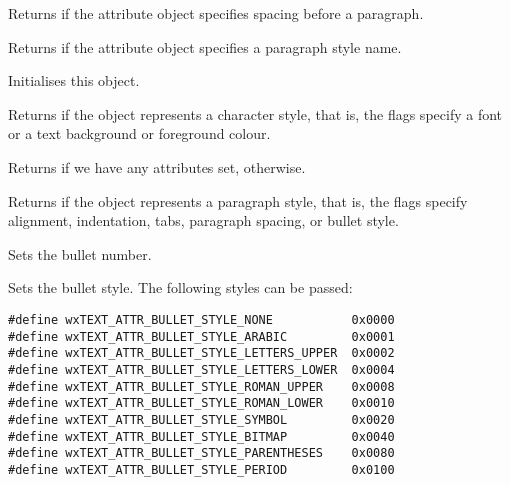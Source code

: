 
Returns \true if the attribute object specifies spacing before a paragraph.

\label{wxtextattrexhasparagraphstylename}


Returns \true if the attribute object specifies a paragraph style name.

\label{wxtextattrexinit}


Initialises this object.

\label{wxtextattrexischaracterstyle}


Returns \true if the object represents a character style, that is,
the flags specify a font or a text background or foreground colour.

\label{wxtextattrexisdefault}


Returns \false if we have any attributes set, \true otherwise.

\label{wxtextattrexisparagraphstyle}


Returns \true if the object represents a paragraph style, that is,
the flags specify alignment, indentation, tabs, paragraph spacing, or
bullet style.

\label{wxtextattrexsetbulletnumber}


Sets the bullet number.

\label{wxtextattrexsetbulletstyle}


Sets the bullet style. The following styles can be passed:

{\small
\begin{verbatim}
#define wxTEXT_ATTR_BULLET_STYLE_NONE           0x0000
#define wxTEXT_ATTR_BULLET_STYLE_ARABIC         0x0001
#define wxTEXT_ATTR_BULLET_STYLE_LETTERS_UPPER  0x0002
#define wxTEXT_ATTR_BULLET_STYLE_LETTERS_LOWER  0x0004
#define wxTEXT_ATTR_BULLET_STYLE_ROMAN_UPPER    0x0008
#define wxTEXT_ATTR_BULLET_STYLE_ROMAN_LOWER    0x0010
#define wxTEXT_ATTR_BULLET_STYLE_SYMBOL         0x0020
#define wxTEXT_ATTR_BULLET_STYLE_BITMAP         0x0040
#define wxTEXT_ATTR_BULLET_STYLE_PARENTHESES    0x0080
#define wxTEXT_ATTR_BULLET_STYLE_PERIOD         0x0100
\end{verbatim}
}

